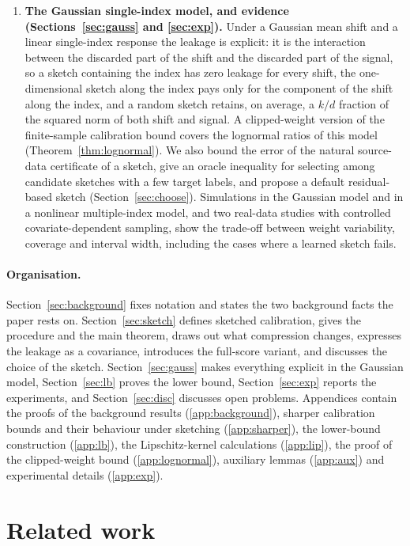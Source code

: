 \documentclass[11pt,a4paper]{article}
\theoremstyle{plain}
\theoremstyle{definition}
\theoremstyle{remark}
\begin{document}
\begin{enumerate}[leftmargin=1.8em,itemsep=2pt]
\item \textbf{The Gaussian single-index model, and evidence (Sections~\ref{sec:gauss} and \ref{sec:exp}).} Under a Gaussian mean shift and a linear single-index response the leakage is explicit: it is the interaction between the discarded part of the shift and the discarded part of the signal, so a sketch containing the index has zero leakage for every shift, the one-dimensional sketch along the index pays only for the component of the shift along the index, and a random sketch retains, on average, a $k/d$ fraction of the squared norm of both shift and signal. A clipped-weight version of the finite-sample calibration bound covers the lognormal ratios of this model (Theorem~\ref{thm:lognormal}). We also bound the error of the natural source-data certificate of a sketch, give an oracle inequality for selecting among candidate sketches with a few target labels, and propose a default residual-based sketch (Section~\ref{sec:choose}). Simulations in the Gaussian model and in a nonlinear multiple-index model, and two real-data studies with controlled covariate-dependent sampling, show the trade-off between weight variability, coverage and interval width, including the cases where a learned sketch fails.
\end{enumerate}

\paragraph{Organisation.} Section~\ref{sec:background} fixes notation and states the two background facts the paper rests on. Section~\ref{sec:sketch} defines sketched calibration, gives the procedure and the main theorem, draws out what compression changes, expresses the leakage as a covariance, introduces the full-score variant, and discusses the choice of the sketch. Section~\ref{sec:gauss} makes everything explicit in the Gaussian model, Section~\ref{sec:lb} proves the lower bound, Section~\ref{sec:exp} reports the experiments, and Section~\ref{sec:disc} discusses open problems. Appendices contain the proofs of the background results (\ref{app:background}), sharper calibration bounds and their behaviour under sketching (\ref{app:sharper}), the lower-bound construction (\ref{app:lb}), the Lipschitz-kernel calculations (\ref{app:lip}), the proof of the clipped-weight bound (\ref{app:lognormal}), auxiliary lemmas (\ref{app:aux}) and experimental details (\ref{app:exp}).

\section{Related work}
\end{document}
